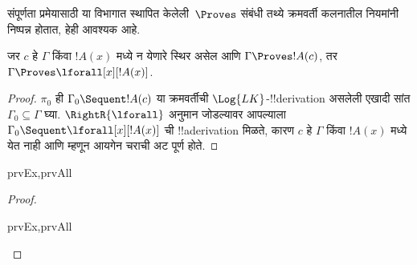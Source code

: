 \documentclass[../../../include/open-logic-section]{subfiles}
\begin{document}

\begin{explain}
  संपूर्णता प्रमेयासाठी या विभागात स्थापित केलेली~$\Proves$ संबंधी तथ्ये
  क्रमवर्ती कलनातील नियमांनी निष्पन्न होतात, हेही आवश्यक आहे.
\end{explain}

\begin{thm}
 जर $c$ हे $\Gamma$ किंवा $!A(x)$ मध्ये
न येणारे स्थिर असेल आणि $\Gamma \Proves !A(c)$, तर $\Gamma
\Proves \lforall[x][!A(x)]$.
\end{thm}

\begin{proof}
$\pi_0$ ही $\Gamma_0 \Sequent !A(c)$ या क्रमवर्तीची $\Log{LK}$-!!{derivation}
असलेली एखादी सांत $\Gamma_0 \subseteq \Gamma$ घ्या.  $\RightR{\lforall}$
अनुमान जोडल्यावर आपल्याला $\Gamma_0 \Sequent
\lforall[x][!A(x)]$ ची !!a{derivation} मिळते, कारण $c$ हे $\Gamma$ किंवा
$!A(x)$ मध्ये येत नाही आणि म्हणून आयगेन चराची अट पूर्ण होते.
\end{proof}

\begin{prop}
\begin{tagenumerate}{prvEx,prvAll}
\end{tagenumerate}
\end{prop}

\begin{proof}
\begin{tagenumerate}{prvEx,prvAll}
\end{tagenumerate}
\end{proof}
\end{document}
